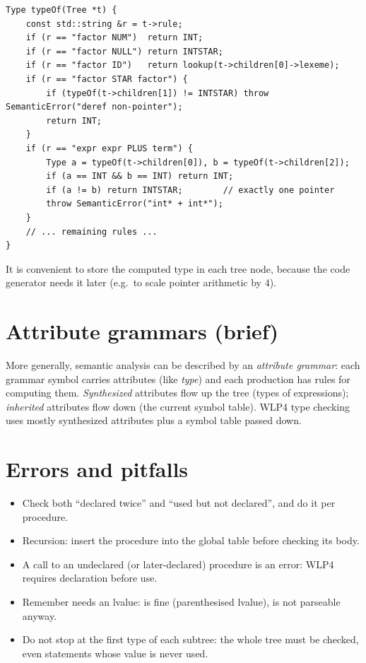 \begin{lstlisting}[style=cpp]
Type typeOf(Tree *t) {
    const std::string &r = t->rule;
    if (r == "factor NUM")  return INT;
    if (r == "factor NULL") return INTSTAR;
    if (r == "factor ID")   return lookup(t->children[0]->lexeme);
    if (r == "factor STAR factor") {
        if (typeOf(t->children[1]) != INTSTAR) throw SemanticError("deref non-pointer");
        return INT;
    }
    if (r == "expr expr PLUS term") {
        Type a = typeOf(t->children[0]), b = typeOf(t->children[2]);
        if (a == INT && b == INT) return INT;
        if (a != b) return INTSTAR;        // exactly one pointer
        throw SemanticError("int* + int*");
    }
    // ... remaining rules ...
}
\end{lstlisting}

It is convenient to store the computed type in each tree node, because the code generator
needs it later (e.g.\ to scale pointer arithmetic by 4).

\section{Attribute grammars (brief)}
\begin{aside}
More generally, semantic analysis can be described by an \emph{attribute grammar}: each
grammar symbol carries attributes (like \emph{type}) and each production has rules for computing
them. \emph{Synthesized} attributes flow up the tree (types of expressions); \emph{inherited}
attributes flow down (the current symbol table). WLP4 type checking uses mostly synthesized
attributes plus a symbol table passed down.
\end{aside}

\section{Errors and pitfalls}
\begin{itemize}
  \item Check both ``declared twice'' and ``used but not declared'', and do it per procedure.
  \item Recursion: insert the procedure into the global table before checking its body.
  \item A call to an undeclared (or later-declared) procedure is an error: WLP4 requires
        declaration before use.
  \item Remember \code{\&} needs an lvalue:  is fine (parenthesised lvalue),  is not
        parseable anyway.
  \item Do not stop at the first type of each subtree: the whole tree must be checked, even
        statements whose value is never used.
\end{itemize}

